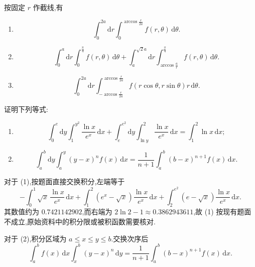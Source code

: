 \begin{solution}
    按固定 $r$ 作截线,有
    \begin{enumerate}
        \item
              \[
                  \displaystyle\int_0^{2a}\!\mathrm{d}r\int_0^{\arccos\frac{r}{2a}}f(r,\theta)\,\mathrm{d}\theta.
              \]
        \item
              \[
                  \displaystyle\int_0^a\!\mathrm{d}r\int_0^{\frac{\pi}{4}}f(r,\theta)\,\mathrm{d}\theta
                  +\int_a^{\sqrt{2}a}\!\mathrm{d}r\int_{\arccos\frac{a}{r}}^{\frac{\pi}{4}}f(r,\theta)\,\mathrm{d}\theta.
              \]
        \item
              \[
                  \displaystyle\int_0^{2a}\!\mathrm{d}r
                  \int_{-\arccos\frac{r}{2a}}^{\arccos\frac{r}{2a}}
                  f(r\cos\theta,r\sin\theta)r\,\mathrm{d}\theta.
              \]
    \end{enumerate}
\end{solution}

\begin{example}
    证明下列等式:
    \begin{enumerate}
        \item
              \[
                  \displaystyle\int_0^e\mathrm{d}y\int_1^{y^2}\dfrac{\ln x}{e^x}\,\mathrm{d}x
                  +\int_e^{e^2}\mathrm{d}y\int_{\ln y}^{2}\dfrac{\ln x}{e^x}\,\mathrm{d}x
                  =\int_1^2\ln x\,\mathrm{d}x;
              \]
        \item
              \[
                  \displaystyle\int_a^b\mathrm{d}y\int_a^y(y-x)^n f(x)\,\mathrm{d}x
                  =\dfrac{1}{n+1}\int_a^b(b-x)^{n+1}f(x)\,\mathrm{d}x.
              \]
    \end{enumerate}
\end{example}
\exampleblank

\begin{solution}
    对于 (1),按题面直接交换积分,左端等于
    \[
        -\int_0^1\sqrt{x}\,\dfrac{\ln x}{e^x}\,\mathrm{d}x
        +\int_1^2\left(e^x-\sqrt{x}\right)\dfrac{\ln x}{e^x}\,\mathrm{d}x
        +\int_2^{e^2}\left(e-\sqrt{x}\right)\dfrac{\ln x}{e^x}\,\mathrm{d}x.
    \]
    其数值约为 $0.7421142902$,而右端为 $2\ln2-1\approx0.3862943611$,故 (1) 按现有题面不成立,原始资料中的积分限或被积函数需要核对.

    对于 (2),积分区域为 $a\leq x\leq y\leq b$.交换次序后
    \[
        \displaystyle\int_a^b f(x)\,\mathrm{d}x\int_x^b(y-x)^n\,\mathrm{d}y
        =\dfrac{1}{n+1}\int_a^b(b-x)^{n+1}f(x)\,\mathrm{d}x.
    \]
\end{solution}

